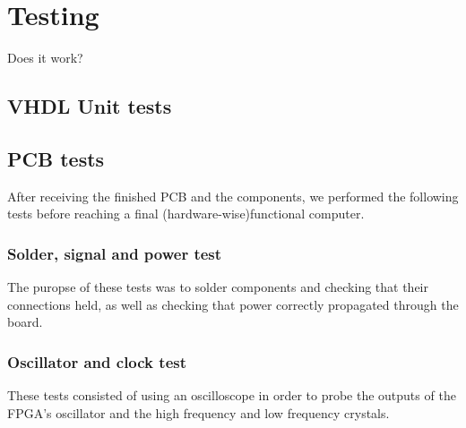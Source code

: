 \documentclass[../main/report.tex]{subfiles}
\begin{document}
\chapter{Testing}

Does it work?

\section{VHDL Unit tests}




\section{PCB tests}

After receiving the finished PCB and the components, we performed the following tests before reaching a final (hardware-wise)functional computer.   

\subsection{Solder, signal and power test}
The puropse of these tests was to solder components and checking that their connections held, as well as checking that power correctly propagated through the board.  


\subsection{Oscillator and clock test}
These tests consisted of using an oscilloscope in order to probe the outputs of the FPGA's oscillator and the high frequency and low frequency crystals.


%
\end{document}
